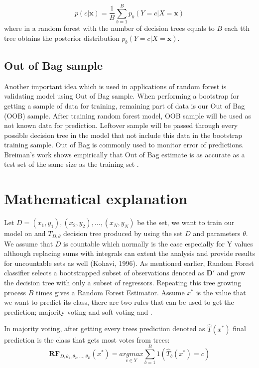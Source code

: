 \begin{equation}
	p(c|\textbf{x}) =  \frac{1}{B} \displaystyle\sum_{b=1}^{B} p_{b}(Y = c |X = \textbf{x})
\end{equation}
where in a random forest with the number of decision trees equals to $B$ each tth tree obtains the posterior 
distribution $ p_{b}(Y = c |X = \textbf{x}) $.

\subsection {Out of Bag sample}
Another important idea which is used in applications of random forest is validating model using Out of Bag sample.
When performing a bootstrap for getting a sample of data for training,
remaining part of data is our Out of Bag (OOB) sample.
After training random forest model, OOB sample will be used as not known data for prediction.
Leftover sample will be passed through every possible decision tree in the model that not include this
data in the bootstrap training sample. Out of Bag is commonly used to monitor error of predictions. 
Breiman’s work \cite{Breiman1996OUT-OF-BAG-E} shows empirically that Out of Bag estimate is as accurate 
as a test set of the same size as the training set \cite{Breiman1996OUT-OF-BAG-E}.


\section{Mathematical explanation}

Let $D = {(x_{1},y_{1}), (x_{2}, y_{2}), ... , (x_{N}, y_{N})}$ be the set, we want to train our model on and $T_{D, \theta}$ 
decision tree produced by using the set $D$ and parameters $\theta$. We assume that $D$ is countable which normally is the 
case especially for Y values although replacing sums with integrals can extent the analysis and 
provide results for uncountable sets as well (Kohavi, 1996). As mentioned earlier, 
Random Forest classifier selects a bootstrapped subset of observations denoted as $\boldsymbol{D'}$ and 
grow the decision tree with only a subset of regressors. Repeating this tree growing process $B$ times 
gives a Random Forest Estimator. Assume $x^*$ is the value that we want to predict its class, 
there are two rules that can be used to get the prediction; majority voting and 
soft voting \cite{louppe2014understanding} and \cite{Zhou2014DrugBank}.

In majority voting, after getting every trees prediction denoted as $\hat{T}(x^*)$ final prediction is the class that gets most votes from trees:
\begin{equation}
\boldsymbol{RF}_{D, \theta_{1}, \theta_{2}, ..., \theta_{B}} (x^*) =
	\underset{c \in Y}{argmax} \sum_{b = 1}^{B}{1(\hat{T}_{b}(x^*) = c)}
\end{equation}


